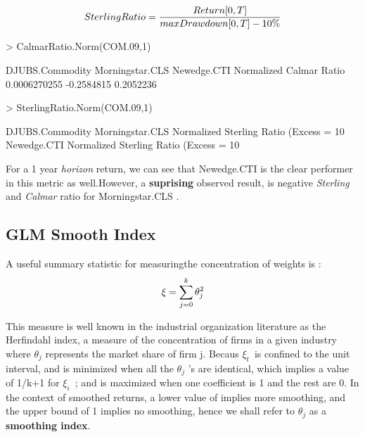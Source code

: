 \documentclass[12pt,letterpaper,english]{article}
\begin{document}
\begin{equation}
 Sterling Ratio  =  \frac{Return [0,T]}{max Drawdown  [0,T] - 10\%} \\
\end{equation}
\begin{Schunk}
\begin{Sinput}
> CalmarRatio.Norm(COM.09,1)
\end{Sinput}
\begin{Soutput}
                        DJUBS.Commodity Morningstar.CLS Newedge.CTI
Normalized Calmar Ratio    0.0006270255      -0.2584815   0.2052236
\end{Soutput}
\begin{Sinput}
> SterlingRatio.Norm(COM.09,1)
\end{Sinput}
\begin{Soutput}
                                         DJUBS.Commodity Morningstar.CLS
Normalized Sterling Ratio (Excess = 10%
                                         Newedge.CTI
Normalized Sterling Ratio (Excess = 10%
\end{Soutput}
\end{Schunk}
For a 1 year \emph{horizon} return, we can see that Newedge.CTI is the clear performer in this metric as well.However, a \textbf{suprising} observed result, is negative \emph{Sterling} and \emph{Calmar} ratio for Morningstar.CLS . 
\subsection{GLM Smooth Index}
A useful summary statistic for measuringthe concentration of weights is :
\begin{equation}
\xi =   \sum_{j=0}^{k} \theta _j^2 \\
\end{equation}

This measure is well known in the industrial organization literature as the Herfindahl index, a measure of the concentration of firms in a given industry where $\theta$\(_j\) represents the market share of firm j. Becaus $\xi_t$\ is confined to the unit interval, and is minimized when all the $\theta$\(_j\) 's are identical, which implies a value of 1/k+1 for $\xi_i$\ ; and is maximized when one coefficient is 1 and the rest are 0. In the context of smoothed returns, a lower value of implies more smoothing, and the upper bound of 1 implies no smoothing, hence we shall refer to $\theta$\(_j\) as a \textbf{smoothing index}.
\end{document}

